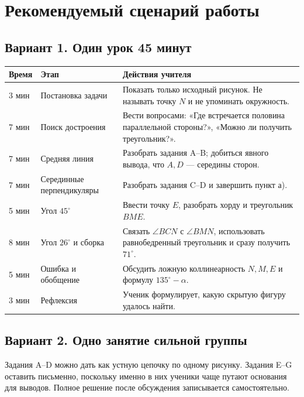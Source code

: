 \section{Рекомендуемый сценарий работы}

\subsection{Вариант 1. Один урок 45 минут}

\begin{tabularx}{\linewidth}{@{}p{19mm}p{45mm}X@{}}
\toprule
Время & Этап & Действия учителя\\
\midrule
3 мин & Постановка задачи & Показать только исходный рисунок. Не называть
точку \(N\) и не упоминать окружность.\\
7 мин & Поиск достроения & Вести вопросами: «Где встречается половина
параллельной стороны?», «Можно ли получить треугольник?».\\
7 мин & Средняя линия & Разобрать задания A–B; добиться явного вывода,
что \(A,D\) — середины сторон.\\
7 мин & Серединные перпендикуляры & Разобрать задания C–D и завершить пункт а).\\
5 мин & Угол \(45^\circ\) & Ввести точку \(E\), разобрать хорду и треугольник
\(BME\).\\
8 мин & Угол \(26^\circ\) и сборка & Связать \(\angle BCN\) с \(\angle BMN\),
использовать равнобедренный треугольник и сразу получить \(71^\circ\).\\
5 мин & Ошибка и обобщение & Обсудить ложную коллинеарность \(N,M,E\) и
формулу \(135^\circ-\alpha\).\\
3 мин & Рефлексия & Ученик формулирует, какую скрытую фигуру удалось найти.\\
\bottomrule
\end{tabularx}

\subsection{Вариант 2. Одно занятие сильной группы}

\begin{teacherbox}
Задания A–D можно дать как устную цепочку по одному рисунку. Задания E–G
оставить письменно, поскольку именно в них ученики чаще путают основания для
выводов. Полное решение после обсуждения записывается самостоятельно.
\end{teacherbox}

